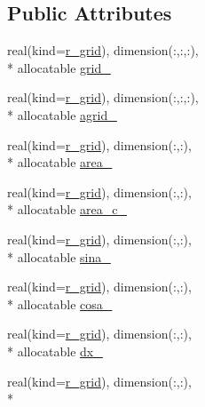 \subsection*{Public Attributes}
\begin{DoxyCompactItemize}
\item 
real(kind=\hyperlink{classfv__arrays__mod_ab0ba8527d270f349a84fa0a330be1923}{r\-\_\-grid}), dimension(\-:,\-:,\-:), \\*
allocatable \hyperlink{structfv__arrays__mod_1_1fv__grid__type_a3e3c763e6b061f4bc4a6e01eab81780b}{grid\-\_}
\item 
real(kind=\hyperlink{classfv__arrays__mod_ab0ba8527d270f349a84fa0a330be1923}{r\-\_\-grid}), dimension(\-:,\-:,\-:), \\*
allocatable \hyperlink{structfv__arrays__mod_1_1fv__grid__type_acad5e5b7fdfee2e55941d628e0fa797f}{agrid\-\_}
\item 
real(kind=\hyperlink{classfv__arrays__mod_ab0ba8527d270f349a84fa0a330be1923}{r\-\_\-grid}), dimension(\-:,\-:), \\*
allocatable \hyperlink{structfv__arrays__mod_1_1fv__grid__type_a2f41c4214f60282af69a29bc6595b1ba}{area\-\_}
\item 
real(kind=\hyperlink{classfv__arrays__mod_ab0ba8527d270f349a84fa0a330be1923}{r\-\_\-grid}), dimension(\-:,\-:), \\*
allocatable \hyperlink{structfv__arrays__mod_1_1fv__grid__type_ad158e67cf5e91973c2d93a9a6f14c884}{area\-\_\-c\-\_}
\item 
real(kind=\hyperlink{classfv__arrays__mod_ab0ba8527d270f349a84fa0a330be1923}{r\-\_\-grid}), dimension(\-:,\-:), \\*
allocatable \hyperlink{structfv__arrays__mod_1_1fv__grid__type_a676e6a901ed0513f6e7f73a921be2d47}{sina\-\_}
\item 
real(kind=\hyperlink{classfv__arrays__mod_ab0ba8527d270f349a84fa0a330be1923}{r\-\_\-grid}), dimension(\-:,\-:), \\*
allocatable \hyperlink{structfv__arrays__mod_1_1fv__grid__type_ad78a7565404904b524a1dd4a445c6381}{cosa\-\_}
\item 
real(kind=\hyperlink{classfv__arrays__mod_ab0ba8527d270f349a84fa0a330be1923}{r\-\_\-grid}), dimension(\-:,\-:), \\*
allocatable \hyperlink{structfv__arrays__mod_1_1fv__grid__type_a0067f1c83c318094681664a78e966e60}{dx\-\_}
\item 
real(kind=\hyperlink{classfv__arrays__mod_ab0ba8527d270f349a84fa0a330be1923}{r\-\_\-grid}), dimension(\-:,\-:), \\*

\end{DoxyCompactItemize}
